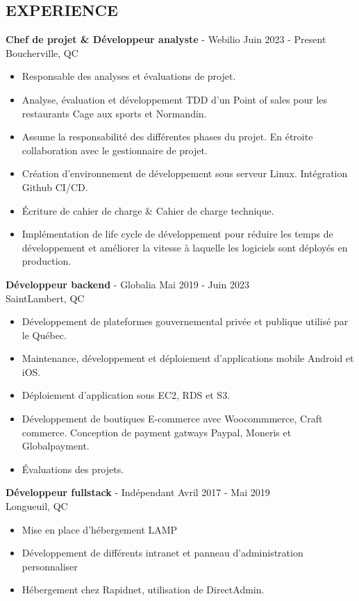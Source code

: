 \documentclass[margin, 10pt]{res} %
\begin{document}
\begin{resume}
\section{EXPERIENCE}

{\textbf{Chef de projet \& Développeur analyste} - Webilio} \hfill Juin 2023 - Present \\
Boucherville, QC
\begin{itemize}
\item Responsable des analyses et évaluations de projet.
\item Analyse, évaluation et développement TDD d'un Point of sales pour les restaurants Cage aux sports et Normandin. 
\item Assume la responsabilité des différentes phases du projet. En étroite collaboration avec le gestionnaire de projet.
\item Création d'environnement de développement sous serveur Linux. Intégration Github CI/CD.
\item Écriture de cahier de charge \& Cahier de charge technique.
\item Implémentation de life cycle de développement pour réduire les temps de développement et améliorer la vitesse à laquelle les logiciels sont déployés en production.
\end{itemize}

{\textbf{Développeur backend} - Globalia} \hfill Mai 2019 - Juin 2023 \\
Saint\-Lambert, QC
\begin{itemize}
\item Développement de plateformes gouvernemental privée et publique utilisé par le Québec.
\item Maintenance, développement et déploiement d'applications mobile Android et iOS.
\item Déploiement d'application sous EC2, RDS et S3.
\item Développement de boutiques E-commerce avec Woocommmerce, Craft commerce. Conception de payment gatways Paypal, Moneris et Globalpayment.
\item Évaluations des projets.
\end{itemize} 

{\textbf{Développeur fullstack} - Indépendant} \hfill Avril 2017 - Mai 2019 \\
Longueuil, QC
\begin{itemize}
\item Mise en place d'hébergement LAMP
\item Développement de différents intranet et panneau d'administration personnaliser
\item Hébergement chez Rapidnet, utilisation de DirectAdmin.
\end{itemize} 


\end{resume}
\end{document}
